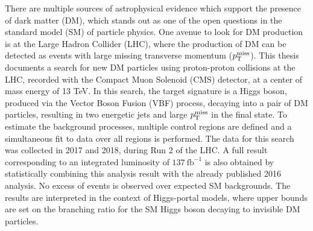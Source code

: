
There are multiple sources of astrophysical evidence which support the presence of dark matter (DM), which stands out as
one of the open questions in the standard model (SM) of particle physics. One avenue to look for DM production is at 
the Large Hadron Collider (LHC), where the production of DM can be detected as events with large missing transverse momentum ($p_{\textrm{T}}^{\textrm{miss}}$).
This thesis documents a search for new DM particles using proton-proton collisions at the LHC, recorded with the Compact Muon Solenoid (CMS)
detector, at a center of mass energy of 13 TeV. In this search, the target signature is a Higgs boson, produced via the Vector Boson Fusion (VBF) process, 
decaying into a pair of DM particles, resulting in two energetic jets and large $p_{\textrm{T}}^{\textrm{miss}}$ in the final state. To estimate the background processes,
multiple control regions are defined and a simultaneous fit to data over all regions is performed. The data for this search was collected in 2017 and 2018, 
during Run 2 of the LHC. A full result corresponding to an integrated luminosity of $137 \ \textrm{fb}^{-1}$
is also obtained by statistically combining this analysis result with the already published 2016 analysis. No excess of events is observed over
expected SM backgrounds. The results are interpreted in the context of Higgs-portal models, where upper bounds are set on 
the branching ratio for the SM Higgs boson decaying to invisible DM particles.


